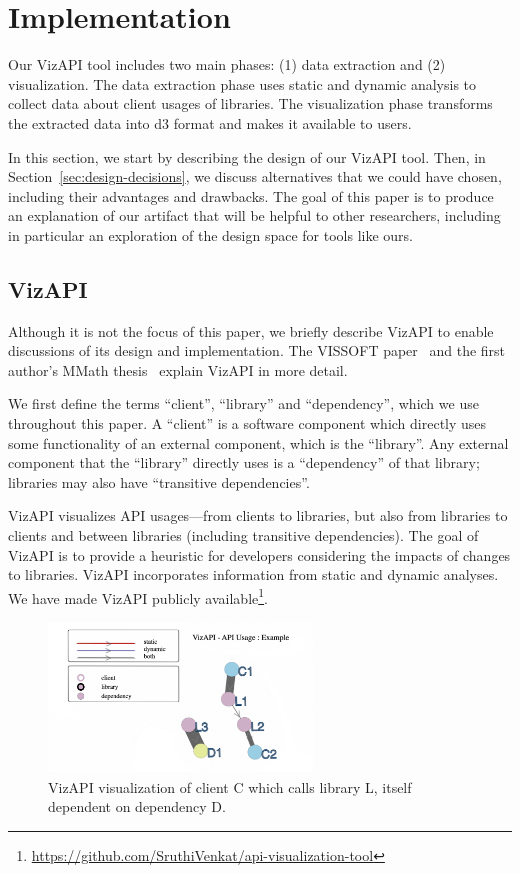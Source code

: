 \section{Implementation}
\label{sec:implementation}
Our VizAPI tool includes two main phases: (1) data extraction and (2)
visualization. The data extraction phase uses static and dynamic
analysis to collect data about client usages of libraries. The
visualization phase transforms the extracted data into d3 format and makes it
available to users.

In this section, we start by describing the design of our VizAPI
tool. Then, in Section~\ref{sec:design-decisions}, we discuss
alternatives that we could have chosen, including their advantages and
drawbacks.  The goal of this paper is to produce an explanation of our
artifact that will be helpful to other researchers, including in
particular an exploration of the design space for tools like ours.

\subsection{VizAPI}
Although it is not the focus of this paper, we briefly describe VizAPI
to enable discussions of its design and implementation.
The VISSOFT paper~\cite{venkatanarayanan22:_vizap}
and the first author's MMath thesis~\cite{venkatanarayanan22:_study_lever_api_usage_patter} explain VizAPI in more detail.

We first define the terms ``client'', ``library'' and ``dependency'', which we use throughout this paper. A ``client'' is a software component which directly uses some functionality of an external component, which is the ``library''. Any external component that the ``library'' directly uses is a ``dependency'' of that library; libraries may also have ``transitive dependencies''.

VizAPI visualizes API usages---from clients to libraries, but also from libraries to clients and between libraries (including transitive dependencies). The goal of VizAPI is to provide a heuristic for developers considering the impacts of changes to libraries. VizAPI incorporates information from static and dynamic analyses.  We have made VizAPI publicly available\footnote{\url{https://github.com/SruthiVenkat/api-visualization-tool}}.

\begin{figure}[h]
\begin{center}
\includegraphics[height=4cm,width=7cm]{images/intro-example.png}
\caption{VizAPI visualization of client C which calls library L, itself dependent on dependency D.}
\label{fig:example}
\end{center}
\end{figure}

